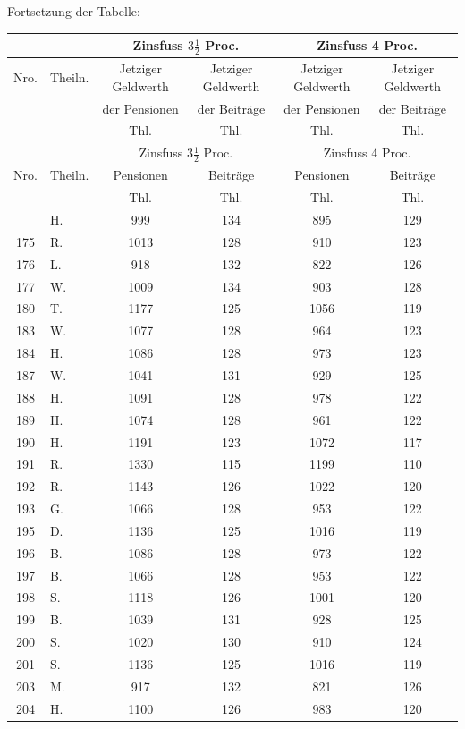 \documentclass[12pt,a4paper]{article}
\begin{document}
Fortsetzung der Tabelle:

\begin{center}
\begin{longtable}{|c|l|c|c|c|c|}
\hline
\multicolumn{2}{|c|}{} & \multicolumn{2}{c|}{Zinsfuss $3\frac{1}{2}$ Proc.} & \multicolumn{2}{c|}{Zinsfuss 4 Proc.} \\
\hline
Nro. & Theiln. & Jetziger Geldwerth & Jetziger Geldwerth & Jetziger Geldwerth & Jetziger Geldwerth \\
 & & der Pensionen & der Beiträge & der Pensionen & der Beiträge \\
 & & Thl. & Thl. & Thl. & Thl. \\
\hline
\endfirsthead
\hline
\multicolumn{2}{|c|}{} & \multicolumn{2}{c|}{Zinsfuss $3\frac{1}{2}$ Proc.} & \multicolumn{2}{c|}{Zinsfuss 4 Proc.} \\
\hline
Nro. & Theiln. & Pensionen & Beiträge & Pensionen & Beiträge \\
 & & Thl. & Thl. & Thl. & Thl. \\
\hline
\endhead
\hline
\endfoot
174 & H. & 999 & 134 & 895 & 129 \\
175 & R. & 1013 & 128 & 910 & 123 \\
176 & L. & 918 & 132 & 822 & 126 \\
177 & W. & 1009 & 134 & 903 & 128 \\
180 & T. & 1177 & 125 & 1056 & 119 \\
183 & W. & 1077 & 128 & 964 & 123 \\
184 & H. & 1086 & 128 & 973 & 123 \\
187 & W. & 1041 & 131 & 929 & 125 \\
188 & H. & 1091 & 128 & 978 & 122 \\
189 & H. & 1074 & 128 & 961 & 122 \\
190 & H. & 1191 & 123 & 1072 & 117 \\
191 & R. & 1330 & 115 & 1199 & 110 \\
192 & R. & 1143 & 126 & 1022 & 120 \\
193 & G. & 1066 & 128 & 953 & 122 \\
195 & D. & 1136 & 125 & 1016 & 119 \\
196 & B. & 1086 & 128 & 973 & 122 \\
197 & B. & 1066 & 128 & 953 & 122 \\
198 & S. & 1118 & 126 & 1001 & 120 \\
199 & B. & 1039 & 131 & 928 & 125 \\
200 & S. & 1020 & 130 & 910 & 124 \\
201 & S. & 1136 & 125 & 1016 & 119 \\
203 & M. & 917 & 132 & 821 & 126 \\
204 & H. & 1100 & 126 & 983 & 120 \\
\hline
\end{longtable}
\end{center}
\end{document}
